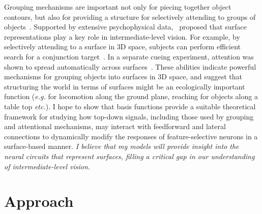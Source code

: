 \documentclass[11pt,notitlepage]{article}
\newcommand{\eg}[0]{{\em e.g.}\xspace}
\newcommand{\etc}[0]{{\em etc.}\xspace}
\begin{document}
Grouping mechanisms are important not only for piecing together object
contours, but also for providing a structure for selectively attending
to groups of objects~\citep{Treisman_Gelade80}. Supported by extensive
psychophysical data,~\citet*{Nakayama_etal95} proposed that surface
representations play a key role in intermediate-level vision. For
example, by selectively attending to a surface in 3D space, subjects
can perform efficient search for a conjunction
target~\citep{Nakayama_Silverman86}. In a separate cueing experiment,
attention was shown to spread automatically across
surfaces~\citep{He_Nakayama95}. These abilities indicate powerful
mechanisms for grouping objects into surfaces in 3D space, and suggest
that structuring the world in terms of surfaces might be an
ecologically important function (\eg for locomotion along the ground
plane, reaching for objects along a table top \etc).
I hope to show that basis functions provide a
    suitable theoretical framework for studying how
top-down signals, including those used by grouping and attentional
mechanisms, may interact with feedforward and lateral connections to
dynamically modify the responses of feature-selective
neurons 
in a surface-based manner.
\textit{I believe that my models will provide insight into the neural circuits that represent surfaces, filling a critical gap in our understanding of intermediate-level vision.}

\section{Approach}
\end{document}
